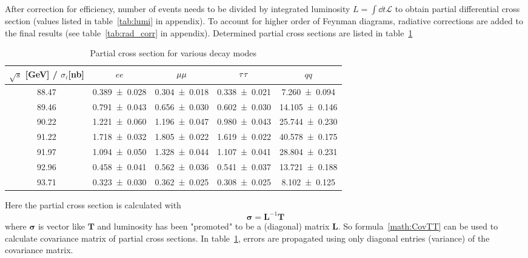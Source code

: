 After correction for efficiency, number of events needs to be divided by integrated luminosity $L = \int\dd{t} \mathcal{L}$ to obtain partial differential cross section (values listed in table~\ref{tab:lumi} in appendix). To account for higher order of Feynman diagrams, radiative corrections are added to the final results (see table~\ref{tab:rad_corr} in appendix). Determined partial cross sections are listed in table~\ref{tab:p_cross}
\begin{table}[ht]
	\centering
	\begin{tabular}{c cccc}
		\toprule
		$\sqrt{s}$ [\si{\giga\eV}] / $\sigma_i$[\si{\nano\barn}] & $ee$ &  $\mu\mu$ &  $\tau\tau$ & $qq$ \\ 
		\midrule 
		\num{88.47} & \num{0.389 +- 0.028} & \num{0.304 +- 0.018} & \num{0.338 +- 0.021} & \num{7.260 +- 0.094}\\
		\num{89.46} & \num{0.791 +- 0.043} & \num{0.656 +- 0.030} & \num{0.602 +- 0.030} & \num{14.105 +- 0.146}\\
		\num{90.22} & \num{1.221 +- 0.060} & \num{1.196 +- 0.047} & \num{0.980 +- 0.043} & \num{25.744 +- 0.230}\\
		\num{91.22} & \num{1.718 +- 0.032} & \num{1.805 +- 0.022} & \num{1.619 +- 0.022} & \num{40.578 +- 0.175}\\
		\num{91.97} & \num{1.094 +- 0.050} & \num{1.328 +- 0.044} & \num{1.107 +- 0.041} & \num{28.804 +- 0.231}\\
		\num{92.96} & \num{0.458 +- 0.041} & \num{0.562 +- 0.036} & \num{0.541 +- 0.037} & \num{13.721 +- 0.188}\\
		\num{93.71} & \num{0.323 +- 0.030} & \num{0.362 +- 0.025} & \num{0.308 +- 0.025} & \num{8.102 +- 0.125}\\
		\bottomrule
	\end{tabular}
	\caption{Partial cross section for various decay modes\label{tab:p_cross}}
\end{table}

Here the partial cross section is calculated with
\begin{equation}
	\pmb\sigma = \mathbf{L}^{-1} \mathbf{T}
\end{equation}
where $\pmb\sigma$ is vector like $\mathbf T$ and luminosity has been "promoted" to be a (diagonal) matrix $\mathbf L$. So formula~\ref{math:CovTT} can be used to calculate covariance matrix of partial cross sections. In table~\ref{tab:p_cross}, errors are propagated using only diagonal entries (variance) of the covariance matrix.

